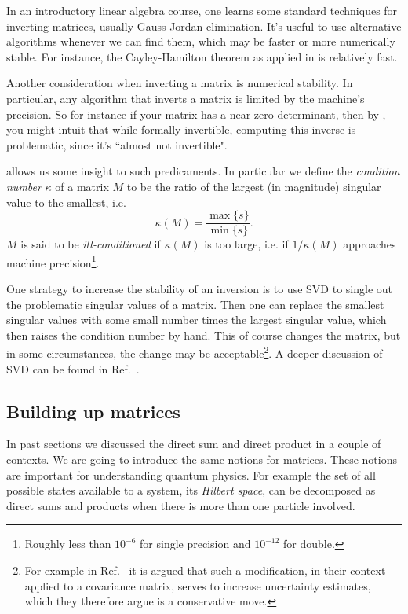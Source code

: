 In an introductory linear algebra course,
one learns some standard techniques for inverting matrices,
usually Gauss-Jordan elimination. 
It's useful to use alternative algorithms whenever we can find them,
which may be faster or more numerically stable.
For instance, the Cayley-Hamilton theorem as applied
in  is relatively fast.

Another consideration when inverting a matrix is numerical
stability. In particular, any algorithm that inverts a matrix is
limited by the machine's precision. So for instance if your
matrix has a near-zero determinant, then by
, you might intuit that while
formally invertible, computing this inverse is problematic,
since it's ``almost not invertible".

 allows us some insight to such predicaments.
In particular we define the {\it condition number}
$\kappa$ of a matrix $M$ to be the ratio of the largest
(in magnitude) singular value to the smallest, i.e.
\begin{equation}
\kappa(M)=\frac{\max\{s\}}{\min\{s\}}.
\end{equation}
$M$ is said to be {\it ill-conditioned}
if $\kappa(M)$ is too large, i.e. if $1/\kappa(M)$ approaches
machine precision\footnote{Roughly less than $10^{-6}$ for
single precision and $10^{-12}$ for double.}.

One strategy to increase the stability of an inversion is to use
SVD to single out the problematic singular values of a matrix.
Then one can replace the smallest singular values with some small
number times the largest singular value, which then raises
the condition number by hand. This of course changes the matrix,
but in some circumstances, the change may be 
acceptable\footnote{For example in Ref.~\cite{dowdall_neutral_2019}
it is argued that such a modification, in their context applied
to a covariance matrix, serves to increase uncertainty estimates, which
they therefore argue is a conservative move.}.
A deeper discussion of SVD can be found in Ref.~\cite{press_numerical_2007}.


\subsection{Building up matrices}\label{sec:buildingMatrices}

In past sections we discussed the direct sum and direct product
in a couple of contexts. We are going to introduce the same notions
for matrices. These notions are important for understanding quantum
physics. For example the set of all possible states available
to a system, its {\it Hilbert space}, can
be decomposed as direct sums and products when there is more
than one particle involved.

